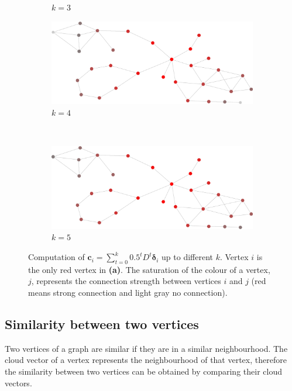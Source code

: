 \documentclass[12pt]{report}
\begin{document}
\begin{figure}[tpb]
\begin{subfigure}[b]{0.5\textwidth}
    \caption{$k=3$}
  \end{subfigure}
  \begin{subfigure}[b]{0.5\textwidth}
    \includegraphics[width=\textwidth]{frame4}
		\caption{$k=4$}
  \end{subfigure}%
  ~
  \begin{subfigure}[b]{0.5\textwidth}
    \includegraphics[width=\textwidth]{frame5}
    \caption{$k=5$}
  \end{subfigure}


  \caption{Computation of $\bm{c}_i = \sum_{t=0}^k 0.5^t D^t \bm{\delta}_i$ up
  to different $k$. Vertex $i$ is the only red vertex in \textbf{(a)}. The
  saturation of the colour of a vertex, $j$, represents the connection strength
  between vertices $i$ and $j$ (red means strong connection and light gray no
  connection).}
  \label{fig:ci_diffusion}
\end{figure}

\subsection{Similarity between two vertices}

Two vertices of a graph are similar if they are in a similar neighbourhood. The
cloud vector of a vertex represents the neighbourhood of that vertex, therefore
the similarity between two vertices can be obtained by comparing their cloud
vectors.
\end{document}
